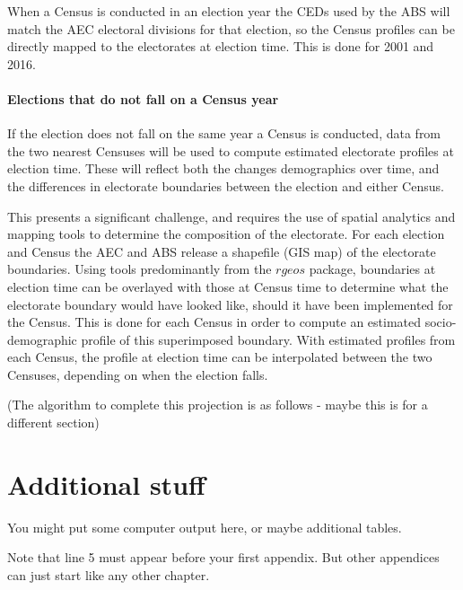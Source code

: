 \documentclass{monashthesis}
\begin{document}
When a Census is conducted in an election year the CEDs used by the ABS
will match the AEC electoral divisions for that election, so the Census
profiles can be directly mapped to the electorates at election time.
This is done for 2001 and 2016.

\subsubsection{Elections that do not fall on a Census
year}\label{elections-that-do-not-fall-on-a-census-year}

If the election does not fall on the same year a Census is conducted,
data from the two nearest Censuses will be used to compute estimated
electorate profiles at election time. These will reflect both the
changes demographics over time, and the differences in electorate
boundaries between the election and either Census.

This presents a significant challenge, and requires the use of spatial
analytics and mapping tools to determine the composition of the
electorate. For each election and Census the AEC and ABS release a
shapefile (GIS map) of the electorate boundaries. Using tools
predominantly from the \(rgeos\) package, boundaries at election time
can be overlayed with those at Census time to determine what the
electorate boundary would have looked like, should it have been
implemented for the Census. This is done for each Census in order to
compute an estimated socio-demographic profile of this superimposed
boundary. With estimated profiles from each Census, the profile at
election time can be interpolated between the two Censuses, depending on
when the election falls.

(The algorithm to complete this projection is as follows - maybe this is
for a different section)

\appendix

\chapter{Additional stuff}\label{additional-stuff}

You might put some computer output here, or maybe additional tables.

Note that line 5 must appear before your first appendix. But other
appendices can just start like any other chapter.

\printbibliography[heading=bibintoc]
\end{document}
